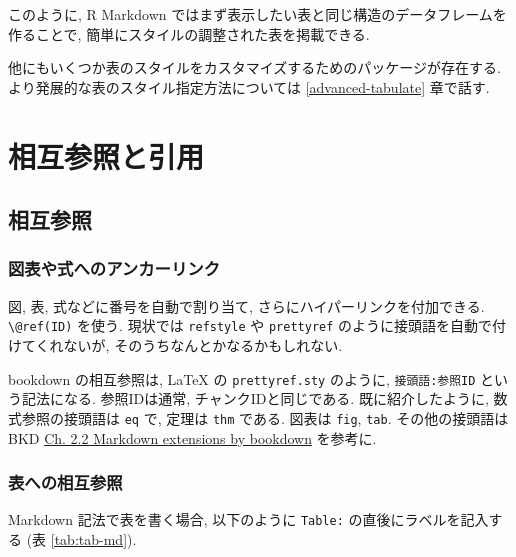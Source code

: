 \documentclass[
  xelatex,ja=standard,jafont=noto]{bxjsbook}
\theoremstyle{definition}
\theoremstyle{definition}
\theoremstyle{definition}
\theoremstyle{definition}
\theoremstyle{remark}
\begin{document}
このように, R Markdown
ではまず表示したい表と同じ構造のデータフレームを作ることで,
簡単にスタイルの調整された表を掲載できる.

他にもいくつか表のスタイルをカスタマイズするためのパッケージが存在する.
より発展的な表のスタイル指定方法については \ref{advanced-tabulate}
章で話す.

\hypertarget{ux76f8ux4e92ux53c2ux7167ux3068ux5f15ux7528}{%
\chapter{相互参照と引用}\label{ux76f8ux4e92ux53c2ux7167ux3068ux5f15ux7528}}

\hypertarget{crossref}{%
\section{相互参照}\label{crossref}}

\hypertarget{ux56f3ux8868ux3084ux5f0fux3078ux306eux30a2ux30f3ux30abux30fcux30eaux30f3ux30af}{%
\subsection{図表や式へのアンカーリンク}\label{ux56f3ux8868ux3084ux5f0fux3078ux306eux30a2ux30f3ux30abux30fcux30eaux30f3ux30af}}

図, 表, 式などに番号を自動で割り当て, さらにハイパーリンクを付加できる.
\texttt{\textbackslash{}@ref(ID)} を使う. 現状では \texttt{refstyle} や
\texttt{prettyref} のように接頭語を自動で付けてくれないが,
そのうちなんとかなるかもしれない.

bookdown の相互参照は, LaTeX の \texttt{prettyref.sty} のように,
\texttt{接頭語:参照ID} という記法になる. 参照IDは通常,
チャンクIDと同じである. 既に紹介したように, 数式参照の接頭語は
\texttt{eq} で, 定理は \texttt{thm} である. 図表は \texttt{fig},
\texttt{tab}. その他の接頭語は BKD
\href{https://bookdown.org/yihui/bookdown/markdown-extensions-by-bookdown.html\#equations}{Ch.
2.2 Markdown extensions by bookdown} を参考に.

\hypertarget{ux8868ux3078ux306eux76f8ux4e92ux53c2ux7167}{%
\subsection{表への相互参照}\label{ux8868ux3078ux306eux76f8ux4e92ux53c2ux7167}}

Markdown 記法で表を書く場合, 以下のように \texttt{Table:}
の直後にラベルを記入する (表 \ref{tab:tab-md}).
\end{document}
